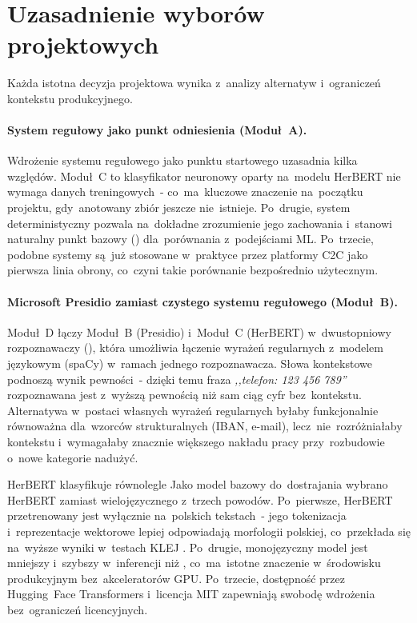 \section{Uzasadnienie wyborów projektowych}

Każda istotna decyzja projektowa wynika z~analizy alternatyw i~ograniczeń
kontekstu produkcyjnego.

\paragraph{System regułowy jako punkt odniesienia (Moduł~A).}
Wdrożenie systemu regułowego jako punktu startowego uzasadnia kilka względów.
  Moduł~C to klasyfikator neuronowy oparty na~modelu HerBERT
nie wymaga danych treningowych~- co~ma~kluczowe znaczenie na~początku
projektu, gdy~anotowany zbiór jeszcze nie~istnieje. Po~drugie, system
deterministyczny pozwala na~dokładne zrozumienie jego zachowania i~stanowi
naturalny punkt bazowy () dla~porównania z~podejściami ML.
Po~trzecie, podobne systemy są~już stosowane w~praktyce przez platformy C2C
jako pierwsza linia obrony, co~czyni takie porównanie bezpośrednio użytecznym.

\paragraph{Microsoft Presidio zamiast czystego systemu regułowego (Moduł~B).}
  Moduł~D łączy Moduł~B (Presidio) i~Moduł~C (HerBERT) w~dwustopniowy
rozpoznawaczy (), która umożliwia łączenie wyrażeń
regularnych z~modelem językowym (spaCy) w~ramach jednego rozpoznawacza.
Słowa kontekstowe podnoszą wynik pewności~- dzięki temu fraza
\textit{,,telefon: 123 456 789''} rozpoznawana jest z~wyższą pewnością niż
sam ciąg cyfr bez~kontekstu. Alternatywa w~postaci własnych wyrażeń regularnych
byłaby funkcjonalnie równoważna dla~wzorców strukturalnych (IBAN, e-mail),
lecz~nie~rozróżniałaby kontekstu i~wymagałaby znacznie większego nakładu pracy
przy~rozbudowie o~nowe kategorie nadużyć.

  HerBERT klasyfikuje równolegle
Jako model bazowy do~dostrajania wybrano HerBERT zamiast wielojęzycznego \xlmr
z~trzech powodów. Po~pierwsze, HerBERT przetrenowany jest wyłącznie na~polskich
tekstach~- jego tokenizacja i~reprezentacje wektorowe lepiej odpowiadają
morfologii polskiej, co~przekłada się na~wyższe wyniki w~testach KLEJ
\cite{bib:herbert}. Po~drugie, monojęzyczny model jest mniejszy i~szybszy
w~inferencji niż \xlmr, co~ma~istotne znaczenie w~środowisku produkcyjnym
bez~akceleratorów GPU. Po~trzecie, dostępność przez Hugging~Face Transformers
\cite{bib:hf-transformers} i~licencja MIT zapewniają swobodę wdrożenia
bez~ograniczeń licencyjnych.

